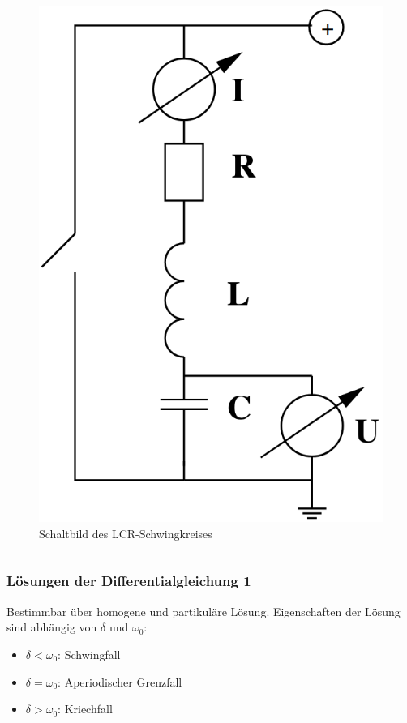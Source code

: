 \documentclass{beamer}
\begin{document}
\begin{frame}
\begin{columns}[c]
\begin{figure}
\includegraphics[width = \textwidth]{abbildungen/lcr_schaltbild.png}
\caption{Schaltbild des LCR-Schwingkreises}
\end{figure}
\end{columns}

\end{frame}


\begin{frame}
\frametitle{Lösungen der Differentialgleichung 1}
Bestimmbar über homogene und partikuläre Lösung.
Eigenschaften der Lösung sind abhängig von $\delta$ und $\omega_0$:
\begin{itemize}
\item $\delta < \omega_0$: Schwingfall
\item $\delta = \omega_0$: Aperiodischer Grenzfall
\item $\delta > \omega_0$: Kriechfall
\end{itemize}
\end{frame}
\end{document}
